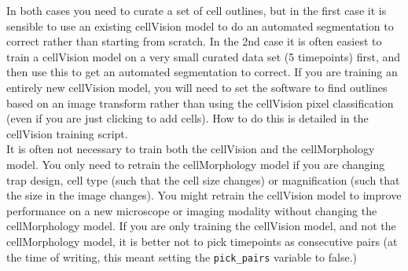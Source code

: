 In both cases you need to curate a set of cell outlines, but in the first case it is sensible to use an existing cellVision model to do an automated segmentation to correct rather than starting from scratch. In the 2nd case it is often easiest to train a cellVision model on a very small curated data set (5 timepoints) first, and then use this to get an automated segmentation to correct. If you are training an entirely new cellVision model, you will need to set the software to find outlines based on an image transform rather than using the cellVision pixel classification (even if you are just clicking to add cells). How to do this is detailed in the cellVision training script.\\
It is often not necessary to train both the cellVision and the cellMorphology model. You only need to retrain the cellMorphology model if you are changing trap design, cell type (such that the cell size changes) or magnification (such that the size in the image changes). You might retrain the cellVision model to improve performance on a new microscope or imaging modality without changing the cellMorphology model. If you are only training the cellVision model, and not the cellMorphology model, it is better not to pick timepoints as consecutive pairs (at the time of writing, this meant setting the \texttt{pick\_pairs} variable to false.)